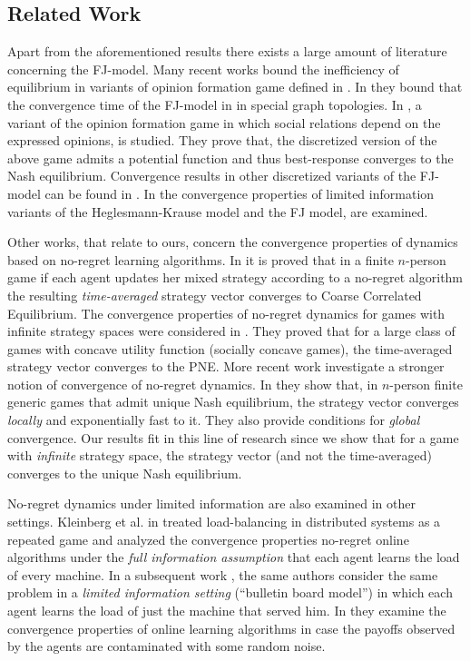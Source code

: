 \subsection{Related Work}
Apart from the aforementioned results there exists a large amount
of literature concerning the FJ-model.
Many recent works \cite{BGM13,CKO13,BFM16,EFHS17} bound the
inefficiency of equilibrium in variants of opinion formation game
defined in \cite{BKO11}. In \cite{GS14} they bound that the convergence
time of the FJ-model in in special graph topologies.
In \cite{BFM16}, a variant of the opinion formation game in which social
relations depend on the expressed opinions, is studied.
They prove that, the discretized version of the above game admits
a potential function and thus best-response converges to the
Nash equilibrium. Convergence results in other discretized variants of
the FJ-model can be found in \cite{YOASS13,FGV16}. In \cite{FPS16} the convergence
properties of limited information variants of the Heglesmann-Krause model \cite{HK}
and the FJ model, are examined.


Other works, that relate to ours, concern the convergence
properties of dynamics based on no-regret learning algorithms.
In \cite{FV97,FS99,SA00,SALS15} it is proved that in a finite $n$-person
game if each agent updates her mixed strategy according to a no-regret
algorithm the resulting \emph{time-averaged} strategy vector converges to
Coarse Correlated Equilibrium. The convergence properties of no-regret dynamics
for games with infinite strategy spaces were considered in \cite{EMN09}.
They proved that for a large class of games with concave utility function
(socially concave games), the time-averaged strategy vector converges to
the PNE. More recent work investigate a stronger notion of convergence of
no-regret dynamics. In \cite{CHM17} they show that,
in $n$-person finite generic games that admit unique Nash equilibrium,
the strategy vector converges \emph{locally} and exponentially fast
to it. They also provide conditions for \emph{global} convergence.
Our results fit in this line of research since we show that
for a game with \emph{infinite} strategy space, the strategy vector
(and not the time-averaged) converges to the unique Nash equilibrium.

No-regret dynamics under limited information are also examined
in other settings. Kleinberg et al. in \cite{KPT09} treated
load-balancing in distributed systems as
a repeated game and analyzed the convergence properties
no-regret online algorithms under the \emph{full information assumption}
that each agent learns the load of every machine.
In a subsequent work \cite{KPT11}, the same authors consider the
same problem in a \emph{limited information setting} (\enquote{bulletin board model})
in which each agent learns the load of just the machine
that served him. In \cite{HCM17,MS17} they examine the convergence
properties of online learning algorithms in case the payoffs observed
by the agents are contaminated with some random noise.


